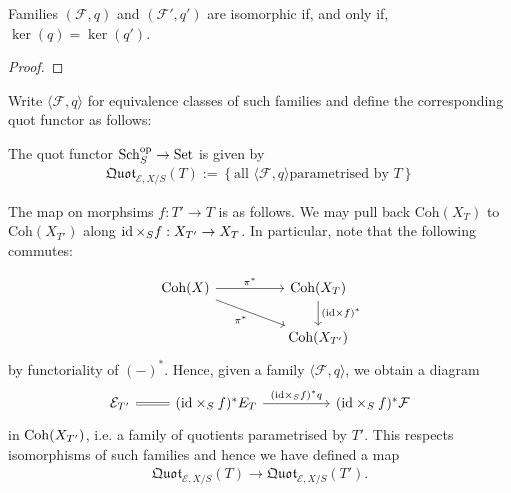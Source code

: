 \documentclass{article}
\begin{document}
\begin{lemma}
  Families $(\mathcal F,q)$ and $(\mathcal F',q')$ are isomorphic if, and only if,
  $\ker(q) = \ker(q')$.
  \begin{proof}
    \missingproof
  \end{proof}
\end{lemma}

Write $\langle\mathcal F,q\rangle$ for equivalence classes
of such families and define the corresponding quot functor
as follows:
\begin{definition}
  The quot functor $\operatorname{Sch}_S^{\text{op}} \to \operatorname{Set}$ is given by
  \begin{align*}
    \mathfrak{Quot}_{\mathcal E,X/S} (T)
    := \left\lbrace{\text{all $\langle\mathcal F,q\rangle$
    parametrised by $T$}}\right\rbrace
  \end{align*}
\end{definition}

The map on morphsims $f:T'\to T$ is as follows.
We may pull back $\text{Coh}(X_T)$ to $\text{Coh}(X_{T'})$
along $\operatorname{id}\times_S f:X_{T'}\to X_T$. In particular,
note that the following commutes:

\begin{equation*}
  \begin{tikzcd}
    {\text{Coh}(X)} && {\text{Coh}(X_T)} \\
                    && {\text{Coh}(X_{T'})}
                    \arrow["{(\text{id}\times f)^*}", from=1-3, to=2-3]
                    \arrow["{\pi^*}", from=1-1, to=1-3]
                    \arrow["{\pi^*}"', from=1-1, to=2-3]
  \end{tikzcd}
\end{equation*}
by functoriality of $(-)^*$. Hence, given a family
$\langle\mathcal F,q\rangle$, we obtain a diagram
\begin{equation*}
  \begin{tikzcd}
    {\mathcal E_{T'}} & {(\text{id}\times_Sf)^* \mathcal \mathcal E_T} && {(\text{id}\times_Sf)^*\mathcal F}
    \arrow["{(\text{id}\times_Sf)^*q}", from=1-2, to=1-4]
    \arrow[Rightarrow, no head, from=1-1, to=1-2]
  \end{tikzcd}
\end{equation*}
in $\operatorname{Coh}(X_{T'})$, i.e. a family of quotients parametrised by
$T'$. This respects isomorphisms of such families and
hence we have defined a map
\begin{align*}
  \mathfrak{Quot}_{\mathcal E,X/S}(T) \to \mathfrak{Quot}_{\mathcal E,X/S}(T').
\end{align*}
\end{document}
